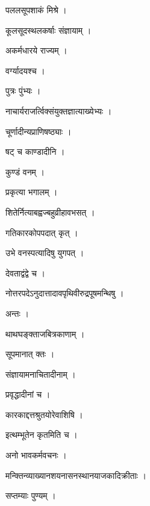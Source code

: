 \documentclass[10pt, openany]{book}
\begin{document}
\noindent पललसूपशाकं मिश्रे ।

\noindent कूलसूदस्थलकर्षाः संज्ञायाम् ।

\noindent अकर्मधारये राज्यम् ।

\noindent वर्ग्यादयश्च ।

\noindent पुत्रः पुंभ्यः ।

\noindent नाचार्यराजर्त्विक्संयुक्तज्ञात्याख्येभ्यः ।

\noindent चूर्णादीन्यप्राणिषष्ठ्याः ।

\noindent षट् च काण्डादीनि ।

\noindent कुण्डं वनम् ।

\noindent प्रकृत्या भगालम् ।

\noindent शितेर्नित्याबह्वज्बहुव्रीहावभसत् ।

\noindent गतिकारकोपपदात् कृत् ।

\noindent उभे वनस्पत्यादिषु युगपत् ।

\noindent देवताद्वंद्वे च ।

\noindent नोत्तरपदेऽनुदात्तादावपृथिवीरुद्रपूषमन्थिषु ।

\noindent अन्तः ।

\noindent थाथघङ्क्ताजबित्रकाणाम् ।

\noindent सूपमानात् क्तः ।

\noindent संज्ञायामनाचितादीनाम् ।

\noindent प्रवृद्धादीनां च ।

\noindent कारकाद्दत्तश्रुतयोरेवाशिषि ।

\noindent इत्थम्भूतेन कृतमिति च ।

\noindent अनो भावकर्मवचनः ।

\noindent मन्क्तिन्व्याख्यानशयनासनस्थानयाजकादिक्रीताः ।

\noindent सप्तम्याः पुण्यम् ।
\end{document}
